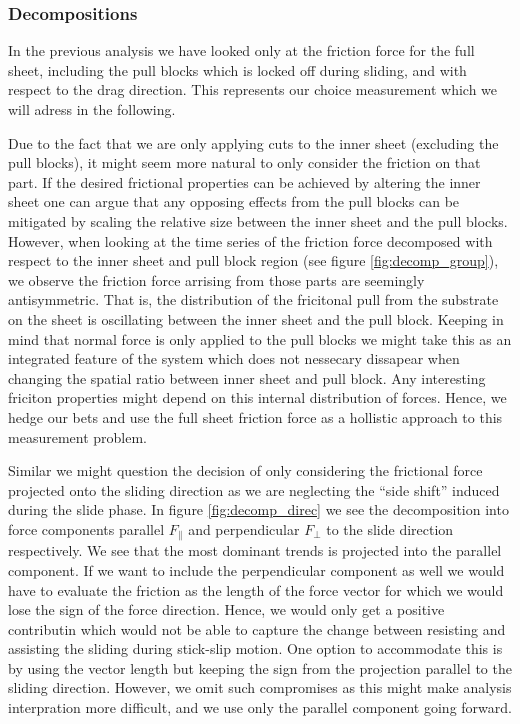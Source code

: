\subsubsection{Decompositions}
In the previous analysis we have looked only at the friction force for the full
sheet, including the pull blocks which is locked off during sliding, and with
respect to the drag direction. This represents our choice measurement which we will adress in the following.

Due to the fact that we are only applying cuts to the inner sheet (excluding the
pull blocks), it might seem more natural to only consider the friction on that
part. If the desired frictional properties can be achieved by altering the inner
sheet one can argue that any opposing effects from the pull blocks can be
mitigated by scaling the relative size between the inner sheet and the pull
blocks. However, when looking at the time series of the friction force
decomposed with respect to the inner sheet and pull block region (see figure
\ref{fig:decomp_group}), we observe the friction force arrising from those parts
are seemingly antisymmetric. That is, the distribution of the fricitonal pull from the substrate on the sheet is
oscillating between the inner sheet and the pull block. Keeping in mind that 
normal force is only applied to the pull blocks we might take this as an
integrated feature of the system which does not nessecary dissapear when changing the spatial ratio between inner sheet and pull block. Any interesting friciton properties might depend on this internal distribution of forces. Hence, we hedge our bets
and use the full sheet friction force as a hollistic approach to this measurement
problem.

Similar we might question the decision of
only considering the frictional force projected onto the sliding direction as
we are neglecting the ``side shift'' induced during the slide phase. In figure \ref{fig:decomp_direc} we see the decomposition into force components parallel $F_{\parallel}$ and perpendicular $F_{\perp}$ to the slide direction respectively. We see that the most dominant trends is projected into the parallel component. If we want to include the perpendicular component as well we would have to evaluate the friction as the length of the force vector for which we would lose the sign of the force direction. Hence, we would only get a positive contributin which would not be able to capture the change between resisting and assisting the sliding during stick-slip motion. One option to accommodate this is by using the vector length but keeping the sign from the projection parallel to the sliding direction. However, we omit such compromises as this might make analysis interpration more difficult, and we use only the parallel component going forward. 

